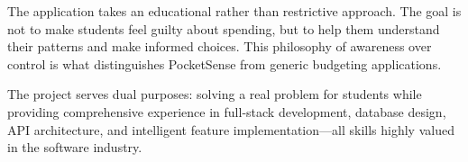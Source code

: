 \documentclass[12pt,a4paper]{article}
\begin{document}
The application takes an educational rather than restrictive approach.
The goal is not to make students feel guilty about spending, but to help them understand their patterns and make informed choices.
This philosophy of awareness over control is what distinguishes PocketSense from generic budgeting applications.

The project serves dual purposes: solving a real problem for students while providing comprehensive experience in full-stack development, database design, API architecture, and intelligent feature implementation---all skills highly valued in the software industry.
\end{document}
